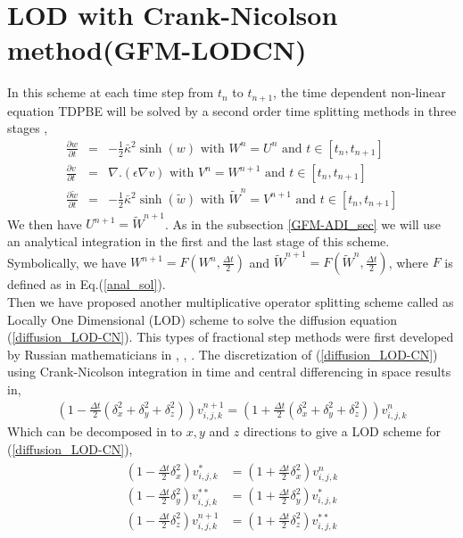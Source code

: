 \section{LOD with Crank-Nicolson method(GFM-LODCN)}\label{GFM-LODCN}
In this scheme at each time step from $t_n$ to $t_{n+1}$, the time dependent non-linear equation TDPBE will be solved by a second order time splitting methods in three stages \cite{Yu2005},
\begin{eqnarray}
  \frac{\partial w}{\partial t}&=& -\frac{1}{2}\bar\kappa^2 \sinh(w) \text{ with } W^n=U^n\text{ and } t \in \left[t_n,t_{n+1}\right]\label{non_linear1_LOD-CN}\\
 \frac{\partial v}{\partial t}&=&  \nabla . (\epsilon\nabla v) \text{    with } V^n=W^{n+1}\text{ and } t \in \left[t_n,t_{n+1}\right]	 \label{diffusion_LOD-CN}\\
 \frac{\partial \tilde{w}}{\partial t}&=& -\frac{1}{2}\bar\kappa^2 \sinh( \tilde{w}) \text{ with } \tilde{W}^n=V^{n+1}\text{ and } t \in \left[t_n,t_{n+1}\right]\label{non_linear2_LOD-CN}
\end{eqnarray}
We then have $U^{n+1}=\tilde{W}^{n+1}$. As in the subsection \ref{GFM-ADI_sec} we will use an analytical integration in the first and the last stage of this scheme. Symbolically, we have $W^{n+1}=F(W^n,\frac{\Delta t}{2})$ and $\tilde{W}^{n+1}=F(\tilde{W}^n,\frac{\Delta t}{2})$, where $F$ is defined as in Eq.(\ref{anal_sol}).\\
Then we have proposed another multiplicative operator splitting scheme called as Locally One Dimensional (LOD) scheme to solve the diffusion equation (\ref{diffusion_LOD-CN}). This types of fractional step methods were first developed by Russian mathematicians in \cite{Yakonov_1963}, \cite{Yanenko_1963}, \cite{Yanenko_1967}. The discretization of (\ref{diffusion_LOD-CN}) using Crank-Nicolson integration in time and central differencing in space results in, 
\begin{eqnarray}
	\left(1-\frac{\Delta t}{2}(\delta^2_x+\delta^2_y+\delta^2_z)\right)v_{i,j,k}^{n+1}=\left(1+\frac{\Delta t}{2}(\delta^2_x+\delta^2_y+\delta^2_z)\right)v_{i,j,k}^n
\end{eqnarray}
Which can be decomposed in to $x,y$ and $z$ directions to give a LOD scheme for (\ref{diffusion_LOD-CN}),
\begin{eqnarray}
	\begin{aligned}
	\left(1-\frac{\Delta t}{2}\delta_x^2\right)v^*_{i,j,k}&=\left(1+\frac{\Delta t}{2}\delta_x^2\right)v^n_{i,j,k}\\
	\left(1-\frac{\Delta t}{2}\delta_y^2\right)v^{**}_{i,j,k}&=\left(1+\frac{\Delta t}{2}\delta_y^2\right)v^*_{i,j,k}\\
	\left(1-\frac{\Delta t}{2}\delta_z^2\right)v^{n+1}_{i,j,k}&=\left(1+\frac{\Delta t}{2}\delta_z^2\right)v^{**}_{i,j,k}\label{LODCN_eq}
	\end{aligned}
\end{eqnarray}

